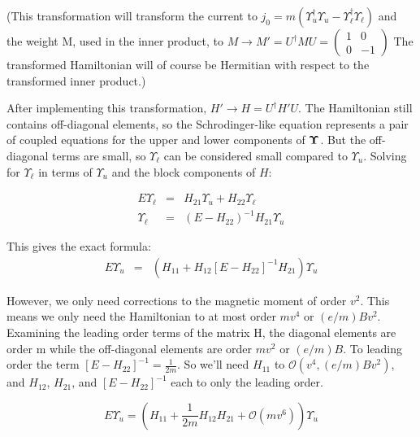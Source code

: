 \small
(This transformation will transform the current to
$	j_0 =  m (\Upsilon_u^\dagger \Upsilon_u  - \Upsilon_\ell^\dagger \Upsilon_\ell)		$
and the weight M, used in the inner product, to
$	M \to M' = U^\dagger M U = ( \begin{smallmatrix} 1 & 0 \\ 0 & -1 \end{smallmatrix})	$
The transformed Hamiltonian will of course be Hermitian with respect to the transformed inner product.)
\normalsize

After implementing this transformation, $H' \to H = U^\dagger H' U $.  The Hamiltonian still contains off-diagonal elements, so the Schrodinger-like equation represents a pair of coupled equations for the upper and lower components of $\mbox{\boldmath$ \Upsilon $}$.  But the off-diagonal terms are small, so $\Upsilon_\ell$ can be considered small compared to $\Upsilon_u$. Solving for $\Upsilon_\ell$ in terms of $\Upsilon_u$ and the block components of $H$: 

\begin{eqnarray*}
	E \Upsilon_\ell &=& 	H_{21} \Upsilon_u + H_{22} \Upsilon_\ell \\
	\Upsilon_\ell 	&=& 	(E - H_{22})^{-1} H_{21} \Upsilon_u
\end{eqnarray*}

This gives the exact formula:
\begin{eqnarray*}
	E \Upsilon_u 	&=&		\left( H_{11} + H_{12}[E-H_{22}]^{-1} H_{21} \right) \Upsilon_u
\end{eqnarray*}

However, we only need corrections to the magnetic moment of order $v^2$. This means we only need the Hamiltonian to at most order $mv^4$ or $(e/m) B v^2$.  Examining the leading order terms of the matrix H, the diagonal elements are order m while the off-diagonal elements are order $mv^2$ or $(e/m) B$.  To leading order the term $[E-H_{22}]^{-1}=\frac{1}{2m}$. So we'll need $H_{11}$ to $\mathcal{O}(v^4, (e/m)Bv^2)$, and $H_{12}$, $H_{21}$, and $[E-H_{22}]^{-1}$ each to only the leading order.


\[	E \Upsilon_u 	=		\left( H_{11} + \frac{1}{2m}H_{12} H_{21} + \mathcal{O}(mv^6)\right) \Upsilon_u \]

